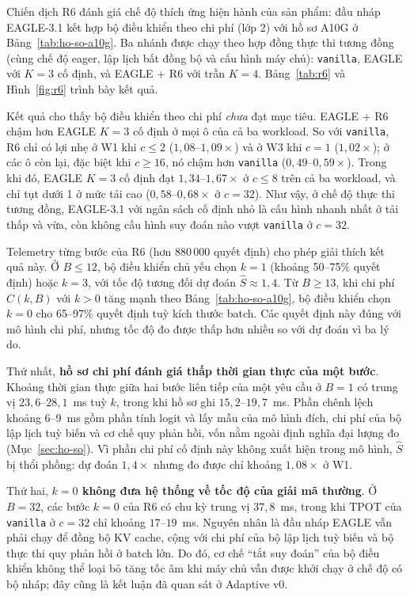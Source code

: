 Chiến dịch R6 đánh giá chế độ thích ứng hiện hành của sản phẩm: đầu nháp EAGLE-3.1 kết hợp bộ điều khiển theo chi phí (lớp 2) với hồ sơ A10G ở Bảng~\ref{tab:ho-so-a10g}. Ba nhánh được chạy theo hợp đồng thực thi tương đồng (cùng chế độ eager, lập lịch bất đồng bộ và cấu hình máy chủ): \texttt{vanilla}, EAGLE với $K = 3$ cố định, và EAGLE + R6 với trần $K = 4$. Bảng~\ref{tab:r6} và Hình~\ref{fig:r6} trình bày kết quả.





Kết quả cho thấy bộ điều khiển theo chi phí \emph{chưa} đạt mục tiêu. EAGLE + R6 chậm hơn EAGLE $K=3$ cố định ở mọi ô của cả ba workload. So với \texttt{vanilla}, R6 chỉ có lợi nhẹ ở W1 khi $c \le 2$ ($1{,}08$--$1{,}09\times$) và ở W3 khi $c = 1$ ($1{,}02\times$); ở các ô còn lại, đặc biệt khi $c \ge 16$, nó chậm hơn \texttt{vanilla} ($0{,}49$--$0{,}59\times$). Trong khi đó, EAGLE $K=3$ cố định đạt $1{,}34$--$1{,}67\times$ ở $c \le 8$ trên cả ba workload, và chỉ tụt dưới 1 ở mức tải cao ($0{,}58$--$0{,}68\times$ ở $c=32$). Như vậy, ở chế độ thực thi tương đồng, EAGLE-3.1 với ngân sách cố định nhỏ là cấu hình nhanh nhất ở tải thấp và vừa, còn không cấu hình suy đoán nào vượt \texttt{vanilla} ở $c = 32$.

Telemetry từng bước của R6 (hơn 880\,000 quyết định) cho phép giải thích kết quả này. Ở $B \le 12$, bộ điều khiển chủ yếu chọn $k=1$ (khoảng 50--75\% quyết định) hoặc $k=3$, với tốc độ tương đối dự đoán $\hat{S} \approx 1{,}4$. Từ $B \ge 13$, khi chi phí $C(k, B)$ với $k > 0$ tăng mạnh theo Bảng~\ref{tab:ho-so-a10g}, bộ điều khiển chọn $k = 0$ cho 65--97\% quyết định tuỳ kích thước batch. Các quyết định này đúng với mô hình chi phí, nhưng tốc độ đo được thấp hơn nhiều so với dự đoán vì ba lý do.

Thứ nhất, \textbf{hồ sơ chi phí đánh giá thấp thời gian thực của một bước}. Khoảng thời gian thực giữa hai bước liên tiếp của một yêu cầu ở $B=1$ có trung vị $23{,}6$--$28{,}1$~ms tuỳ $k$, trong khi hồ sơ ghi $15{,}2$--$19{,}7$~ms. Phần chênh lệch khoảng 6--9~ms gồm phần tính logit và lấy mẫu của mô hình đích, chi phí của bộ lập lịch tuỳ biến và cơ chế quy phản hồi, vốn nằm ngoài định nghĩa đại lượng đo (Mục~\ref{sec:ho-so}). Vì phần chi phí cố định này không xuất hiện trong mô hình, $\hat S$ bị thổi phồng: dự đoán $1{,}4\times$ nhưng đo được chỉ khoảng $1{,}08\times$ ở W1.

Thứ hai, \textbf{$k = 0$ không đưa hệ thống về tốc độ của giải mã thường}. Ở $B = 32$, các bước $k = 0$ của R6 có chu kỳ trung vị $37{,}8$~ms, trong khi TPOT của \texttt{vanilla} ở $c = 32$ chỉ khoảng $17$--$19$~ms. Nguyên nhân là đầu nháp EAGLE vẫn phải chạy để đồng bộ KV cache, cộng với chi phí của bộ lập lịch tuỳ biến và bộ thực thi quy phản hồi ở batch lớn. Do đó, cơ chế ``tắt suy đoán'' của bộ điều khiển không thể loại bỏ tăng tốc âm khi máy chủ vẫn được khởi chạy ở chế độ có bộ nháp; đây cũng là kết luận đã quan sát ở Adaptive v0.

